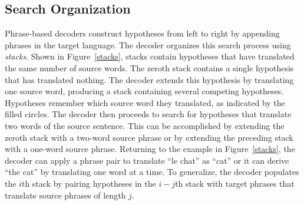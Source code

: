 \documentclass[11pt]{article}
\begin{document}
\subsection{Search Organization}
\label{basic_search}
Phrase-based decoders construct hypotheses from left to right by appending phrases in the target language.  The decoder organizes this search process using \emph{stacks}.  Shown in Figure~\ref{stacks}, stacks contain hypotheses that have translated the same number of source words.  The zeroth stack contains a single hypothesis that has translated nothing.  The decoder extends this hypothesis by translating one source word, producing a stack containing several competing hypotheses.  Hypotheses remember which source word they translated, as indicated by the filled circles.  The decoder then proceeds to search for hypotheses that translate two words of the source sentence.  This can be accomplished by extending the zeroth stack with a two-word source phrase or by extending the preceding stack with a one-word source phrase.  Returning to the example in Figure~\ref{stacks}, the decoder can apply a phrase pair to translate ``le chat'' as ``cat'' or it can derive ``the cat'' by translating one word at a time.  To generalize, the decoder populates the $i$th stack by pairing hypotheses in the $i-j$th stack with target phrases that translate source phrases of length $j$.  

  
\newcommand{\csiz}{1.5pt}
\newcommand{\copen}{\node[draw,on chain,circle,inner sep=\csiz] {};}
\newcommand{\cfull}{\node[draw,on chain,circle,fill=black,inner sep=\csiz] {};}
\newcommand{\cov}[2]{\begin{tikzpicture}[start chain,node distance=1pt]#1\node[on chain,textbase]{#2};\end{tikzpicture}}
\newcommand{\clin}{\\[-5pt]}
\end{document}
